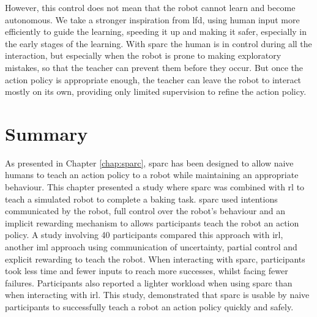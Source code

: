 However, this control does not mean that the robot cannot learn and become autonomous. We take a stronger inspiration from \gls{lfd}, using human input more efficiently to guide the learning, speeding it up and making it safer, especially in the early stages of the learning. With \gls{sparc} the human is in control during all  the interaction, but especially when the robot is prone to making exploratory mistakes, so that the teacher can prevent them before they occur. But once the action policy is appropriate enough, the teacher can leave the robot to interact mostly on its own, providing only limited supervision to refine the action policy.


\section{Summary}

As presented in Chapter \ref{chap:sparc}, \gls{sparc} has been designed to allow naive humans to teach an action policy to a robot while maintaining an appropriate behaviour. This chapter presented a study where \gls{sparc} was combined with \gls{rl} to teach a simulated robot to complete a baking task. \gls{sparc} used intentions communicated by the robot, full control over the robot's behaviour and an implicit rewarding mechanism to allows participants teach the robot an action policy. A study involving 40 participants compared this approach with \gls{irl}, another \gls{iml} approach using communication of uncertainty, partial control and explicit rewarding to teach the robot. When interacting with \gls{sparc}, participants took less time and fewer inputs to reach more successes, whilst facing fewer failures. Participants also reported a lighter workload when using \gls{sparc} than when interacting with \gls{irl}. This study, demonstrated that \gls{sparc} is usable by naive participants to successfully teach a robot an action policy quickly and safely.

